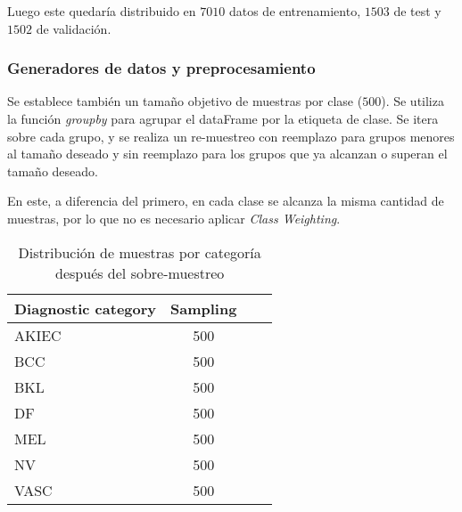 Luego este quedaría distribuido en $7010$ datos de entrenamiento, $1503$ de test y $1502$ de validación.

\subsubsection*{Generadores de datos y preprocesamiento}

Se establece también un tamaño objetivo de muestras por clase ($500$). Se utiliza la función \textit{groupby} para agrupar el dataFrame por la etiqueta de clase. Se itera sobre cada grupo, y se realiza un re-muestreo con reemplazo para grupos menores al tamaño deseado y sin reemplazo para los grupos que ya alcanzan o superan el tamaño deseado.

En este, a diferencia del primero, en cada clase se alcanza la misma cantidad de muestras, por lo que no es necesario aplicar \textit{Class Weighting}.

\begin{table}[ht]
   \centering
   \begin{tabular}{lccc}
   \hline
   Diagnostic category & Sampling  \\ \hline
   AKIEC & 500 \\
   BCC & 500 \\
   BKL & 500 \\
   DF & 500 \\
   MEL & 500 \\
   NV & 500 \\
   VASC & 500 \\ \hline
   \end{tabular}
   \caption{Distribución de muestras por categoría después del sobre-muestreo}
   \label{tab:sampling_distribution}
   \end{table}